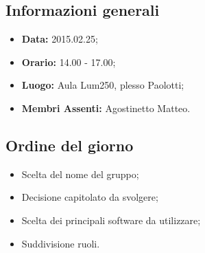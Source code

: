 \subsection{Informazioni generali}
\begin{itemize}
	\item \textbf{Data:} 2015.02.25;
	\item \textbf{Orario:} 14.00 - 17.00;
	\item \textbf{Luogo:} Aula Lum250, plesso Paolotti;
	\item \textbf{Membri Assenti:} Agostinetto Matteo.
\end{itemize}

\subsection{Ordine del giorno}
\begin{itemize}
	\item Scelta del nome del gruppo;
	\item Decisione capitolato da svolgere;
	\item Scelta dei principali software da utilizzare;
	\item Suddivisione ruoli.
\end{itemize}








